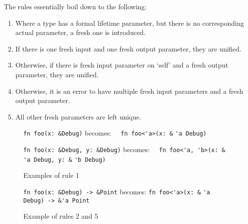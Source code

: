 The rules essentially boil down to the following:
\begin{enumerate}
\item Where a type has a formal lifetime parameter, but there is no corresponding actual parameter, a fresh one is introduced.
\item If there is one fresh input and one fresh output parameter, they are unified.
\item Otherwise, if there is fresh input parameter on `self' and a fresh output parameter, they are unified.
\item Otherwise, it is an error to have multiple fresh input parameters and a fresh output parameter.
\item All other fresh parameters are left unique.
\end{enumerate}

\begin{figure}
{\verb|fn foo(x: &Debug)|}\newline
becomes:\newline
{\verb|  fn foo<'a>(x: &|}
{\color{red} \verb|'a|}{\verb| Debug)|}

\vspace{4mm}

{\verb|fn foo(x: &Debug, y: &Debug)|}\newline
becomes:\newline
{\verb|  fn foo<'a, 'b>(x: &|}
{\color{red} \verb|'a|}{\verb| Debug, y: &|}{\color{red} \verb|'b|}{\verb| Debug)|}

\caption{Examples of rule 1}
\label{Fig:lifetimes2}
\end{figure}

\begin{figure}
{\verb|fn foo(x: &Debug) -> &Point|}\newline
becomes:
{\verb|fn foo<'a>(x: &|}
{\color{red} \verb|'a|}{\verb| Debug) -> &|}{\color{blue}\verb|'a|}{\verb| Point|}

\vspace{4mm}

\caption{Example of rules 2 and 5}
\label{Fig:lifetimes3}
\end{figure}

